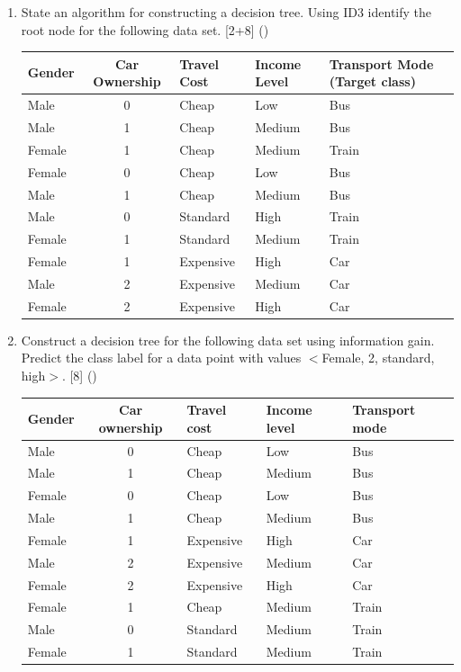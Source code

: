 \documentclass[12pt]{article}
\begin{document}
\begin{enumerate}[topsep=0pt, noitemsep]
      \item State an algorithm for constructing a decision tree. Using ID3 identify the root node for the following data set. \hfill [2+8] ()\\
        \small
        \begin{tabular}{|l|c|l|l|l|}
          \hline
          Gender & Car Ownership & Travel Cost & Income Level & Transport Mode (Target class) \\ \hline
          Male & 0 & Cheap & Low & Bus \\ \hline
          Male & 1 & Cheap & Medium & Bus \\ \hline
          Female & 1 & Cheap & Medium & Train \\ \hline
          Female & 0 & Cheap & Low & Bus \\ \hline
          Male & 1 & Cheap & Medium & Bus \\ \hline
          Male & 0 & Standard & High & Train \\ \hline
          Female & 1 & Standard & Medium & Train \\ \hline
          Female & 1 & Expensive & High & Car \\ \hline
          Male & 2 & Expensive & Medium & Car \\ \hline
          Female & 2 & Expensive & High & Car \\ \hline
        \end{tabular}
        \normalsize

      \item Construct a decision tree for the following data set using information gain. Predict the class label for a data point with values $<$Female, 2, standard, high$>$. \hfill [8] ()\\
        \small
        \begin{tabular}{|l|c|l|l|l|}
          \hline
          Gender & Car ownership & Travel cost & Income level & Transport mode \\ \hline
          Male & 0 & Cheap & Low & Bus \\ \hline
          Male & 1 & Cheap & Medium & Bus \\ \hline
          Female & 0 & Cheap & Low & Bus \\ \hline
          Male & 1 & Cheap & Medium & Bus \\ \hline
          Female & 1 & Expensive & High & Car \\ \hline
          Male & 2 & Expensive & Medium & Car \\ \hline
          Female & 2 & Expensive & High & Car \\ \hline
          Female & 1 & Cheap & Medium & Train \\ \hline
          Male & 0 & Standard & Medium & Train \\ \hline
          Female & 1 & Standard & Medium & Train \\ \hline
        \end{tabular}
        \normalsize


\end{enumerate}
\end{document}
